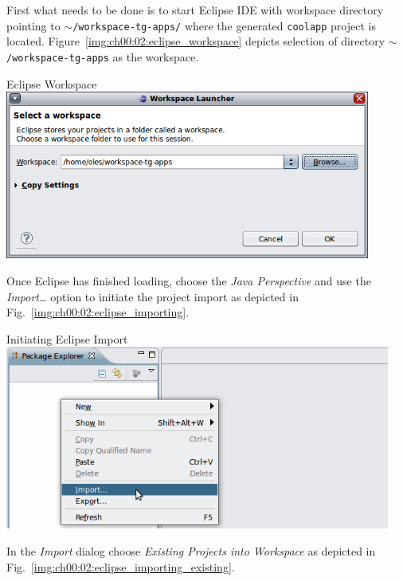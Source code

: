   First what needs to be done is to start Eclipse IDE with workspace directory pointing to \texttt{$\sim$/workspace-tg-apps/} where the generated \texttt{coolapp} project is located.
  Figure~\ref{img:ch00:02:eclipse_workspace} depicts selection of directory \texttt{$\sim$/workspace-tg-apps} as the workspace.  

  \begin{image}{Eclipse Workspace}{\label{img:ch00:02:eclipse_workspace}}    
    \includegraphics[width=0.9\textwidth]{parts/00-part/chapters/01-application-modules/images/07-eclipse-workspace.png}
  \end{image}

  Once Eclipse has finished loading, choose the \emph{Java Perspective} and use the \emph{Import\ldots} option to initiate the project import as depicted in Fig.~\ref{img:ch00:02:eclipse_importing}.
  
  \begin{image}{Initiating Eclipse Import}{\label{img:ch00:02:eclipse_importing}}    
    \includegraphics[width=0.95\textwidth]{parts/00-part/chapters/01-application-modules/images/08-eclipse-importing.png}
  \end{image}

  In the \emph{Import} dialog choose \emph{Existing Projects into Workspace} as depicted in Fig.~\ref{img:ch00:02:eclipse_importing_existing}.

